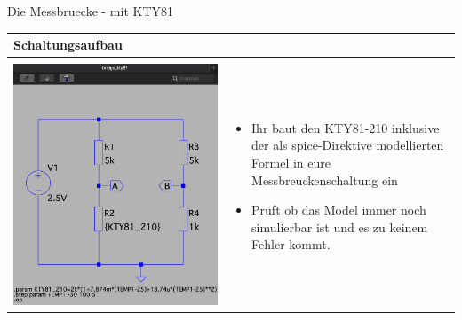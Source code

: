 \begin{frame}[t]{Die Messbruecke - mit KTY81}

    \begin{spacing}{0.9} \begin{tiny}
            \begin{table}[h!]
                \begin{tabular}{p{5cm} p{5cm} }
                    \hline
                    \textbf{Schaltungsaufbau} \\
                    \hline                    \\
                    \begin{minipage}{0.5\textwidth}
                        \includegraphics[width=0.9\linewidth]{pictures/mb_kty81.png}
                    \end{minipage}
                     &
                    \begin{minipage}{0.5\textwidth}
                        \begin{itemize}
                            \item Ihr baut den KTY81-210 inklusive der als spice-Direktive modellierten Formel in eure Messbreuckenschaltung ein
                            \item Prüft ob das Model immer noch simulierbar ist und es zu keinem Fehler kommt.
                        \end{itemize}
                    \end{minipage}
                    \\
                \end{tabular}

            \end{table}

        \end{tiny} \end{spacing}

\end{frame}


